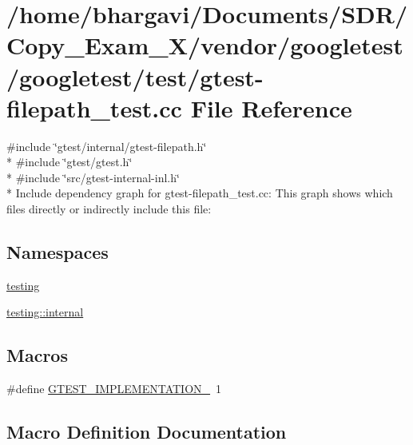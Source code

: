 \hypertarget{gtest-filepath__test_8cc}{}\section{/home/bhargavi/\+Documents/\+S\+D\+R/\+Copy\+\_\+\+Exam\+\_\+X/vendor/googletest/googletest/test/gtest-\/filepath\+\_\+test.cc File Reference}
\label{gtest-filepath__test_8cc}
{\ttfamily \#include \char`\"{}gtest/internal/gtest-\/filepath.\+h\char`\"{}}\\*
{\ttfamily \#include \char`\"{}gtest/gtest.\+h\char`\"{}}\\*
{\ttfamily \#include \char`\"{}src/gtest-\/internal-\/inl.\+h\char`\"{}}\\*
Include dependency graph for gtest-\/filepath\+\_\+test.cc\+:
This graph shows which files directly or indirectly include this file\+:
\subsection*{Namespaces}
\begin{DoxyCompactItemize}
\item 
 \hyperlink{namespacetesting}{testing}
\item 
 \hyperlink{namespacetesting_1_1internal}{testing\+::internal}
\end{DoxyCompactItemize}
\subsection*{Macros}
\begin{DoxyCompactItemize}
\item 
\#define \hyperlink{gtest-filepath__test_8cc_a83bd232fd1077579fada92c31bb7469f}{G\+T\+E\+S\+T\+\_\+\+I\+M\+P\+L\+E\+M\+E\+N\+T\+A\+T\+I\+O\+N\+\_\+}~1
\end{DoxyCompactItemize}


\subsection{Macro Definition Documentation}
